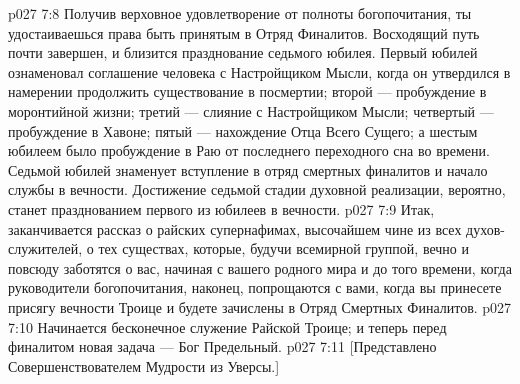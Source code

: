 \vs p027 7:8 \pc Получив верховное удовлетворение от полноты богопочитания, ты удостаиваешься права быть принятым в Отряд Финалитов. Восходящий путь почти завершен, и близится празднование седьмого юбилея. Первый юбилей ознаменовал соглашение человека с Настройщиком Мысли, когда он утвердился в намерении продолжить существование в посмертии; второй --- пробуждение в моронтийной жизни; третий --- слияние с Настройщиком Мысли; четвертый --- пробуждение в Хавоне; пятый --- нахождение Отца Всего Сущего; а шестым юбилеем было пробуждение в Раю от последнего переходного сна во времени. Седьмой юбилей знаменует вступление в отряд смертных финалитов и начало службы в вечности. Достижение седьмой стадии духовной реализации, вероятно, станет празднованием первого из юбилеев в вечности.
\vs p027 7:9 \pc Итак, заканчивается рассказ о райских супернафимах, высочайшем чине из всех духов\hyp{}служителей, о тех существах, которые, будучи всемирной группой, вечно и повсюду заботятся о вас, начиная с вашего родного мира и до того времени, когда руководители богопочитания, наконец, попрощаются с вами, когда вы принесете присягу вечности Троице и будете зачислены в Отряд Смертных Финалитов.
\vs p027 7:10 Начинается бесконечное служение Райской Троице; и теперь перед финалитом новая задача --- Бог Предельный.
\vsetoff
\vs p027 7:11 [Представлено Совершенствователем Мудрости из Уверсы.]
